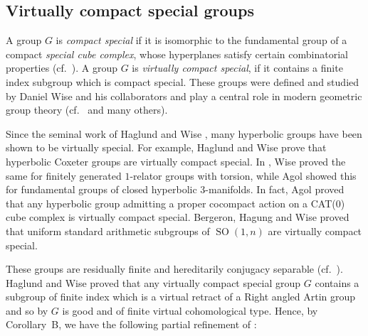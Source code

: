 \documentclass[12pt,twoside]{amsart}
\newcommand\mcC{{\mathcal C}}
\newcommand\SO{\operatorname{SO}}
\newtheorem{lemma}[theorem]{Lemma}
\theoremstyle{definition}
\begin{document}
\subsection{Virtually compact special groups}
A group $G$ is \emph{compact special} if it is isomorphic to the fundamental group of a compact \emph{special cube complex}, 
whose hyperplanes satisfy certain combinatorial properties (cf.\ \cite[Sec. 3]{H-W-1}).
A group $G$ is \emph{virtually compact special}, if it contains a finite index subgroup which is compact special.
These groups were defined and studied by Daniel Wise and his collaborators and play a central role in modern geometric group theory 
(cf.\ \cite{BergeronHaglundWise2011,  H-W-1, Wise_sm-c, Wise-qc-h} and many others).

Since the seminal work of Haglund and Wise \cite{H-W-1}, many hyperbolic groups have been shown to be virtually special. 
For example, Haglund and Wise \cite{HW} prove that hyperbolic Coxeter groups are virtually compact special. 
In \cite{Wise-qc-h}, Wise proved the same for finitely generated $1$-relator groups with torsion, while
Agol \cite{Agol} showed this for fundamental groups of closed hyperbolic $3$-manifolds.
In fact, Agol \cite{Agol} proved that any hyperbolic group admitting a proper cocompact action on a CAT($0$)
cube complex is virtually compact special. Bergeron, Hagung and Wise  \cite[Theorem 1.10]{BergeronHaglundWise2011} 
proved that uniform standard arithmetic subgroups of $\SO(1,n)$ are virtually compact special. 

These groups are residually finite and hereditarily conjugacy separable (cf.\ \cite[Theorem~1.1]{MZ}). Haglund and Wise \cite{H-W-1} 
proved that any virtually compact special group $G$ contains a subgroup of finite index which is a virtual retract of a Right angled 
Artin group and so by \cite[Proposition 3.8 and the proof of Proposition 3.1]{MZ} 
$G$ is good and of finite virtual cohomological type. Hence, by Corollary~B, we have the following partial refinement of \cite[Theorem~1.1]{MZ}:




\end{document}
